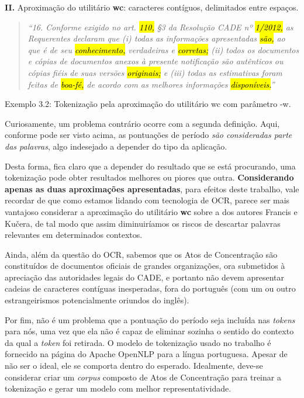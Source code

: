 \documentclass[11pt]{report}
\newcommand{\quotes}[1]{``#1''}
\begin{document}
\textbf{II.} Aproximação do utilitário \textbf{wc}: caracteres contíguos, delimitados entre espaços.

\begin{quote}
  \textit{\quotes{16. Conforme exigido no art. \hl{110,} §3 da Resolução CADE nº \hl{1/2012,} as Requerentes declaram que (i) todas as informações apresentadas \hl{\mbox{são,}} ao que é de seu
  \hl{conhecimento,} verdadeiras e \hl{corretas;} (ii) todos os documentos e cópias de documentos anexos à presente notificação são autênticos ou cópias fiéis de suas versões \hl{originais;}
  e (iii) todas as estimativas foram feitas de \hl{\mbox{boa-fé,}} de acordo com as melhores informações \hl{\mbox{disponíveis.}}}}
\end{quote}
\begin{center}
  Exemplo 3.2: Tokenização pela aproximação do utilitário wc com parâmetro -w.
\end{center}

Curiosamente, um problema contrário ocorre com a segunda definição. Aqui, conforme pode ser visto acima, as pontuações de período \textit{são consideradas parte das palavras}, algo
indesejado a depender do tipo da aplicação.

Desta forma, fica claro que a depender do resultado que se está procurando, uma tokenização pode obter resultados melhores ou piores que outra.
\textbf{Considerando apenas as duas aproximações apresentadas}, para efeitos deste trabalho,
vale recordar de que como estamos lidando com tecnologia de OCR, parece ser mais vantajoso considerar a aproximação do utilitário \textbf{wc} sobre a dos autores
Francis e Kučera, de tal modo que assim diminuiríamos os riscos de descartar palavras relevantes em determinados contextos.

Ainda, além da questão do OCR, sabemos que os Atos de Concentração são constituídos de documentos oficiais de grandes organizações, ora submetidos à apreciação das
autoridades legais do CADE, e portanto não devem apresentar cadeias de caracteres contíguas inesperadas, fora do português (com um ou outro estrangeirismos
potencialmente oriundos do inglês).

Por fim, não é um problema que a pontuação do período seja incluída nas \textit{tokens} para nós, uma vez que ela não é capaz de eliminar sozinha o sentido do contexto da qual
a \textit{token} foi retirada. O modelo de tokenização usado no trabalho é fornecido na página do Apache OpenNLP para a língua portuguesa. Apesar de não ser o ideal, ele se comporta
dentro do esperado. Idealmente, deve-se considerar criar um \textit{corpus} composto de Atos de Concentração para treinar a tokenização e gerar um modelo com melhor representatividade.
\end{document}
